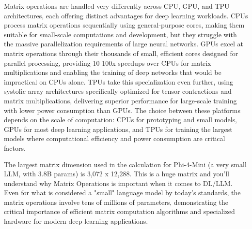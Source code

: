 \begin{remark}
Matrix operations are handled very differently across CPU, GPU, and TPU architectures, each offering distinct advantages for deep learning workloads. CPUs process matrix operations sequentially using general-purpose cores, making them suitable for small-scale computations and development, but they struggle with the massive parallelization requirements of large neural networks. GPUs excel at matrix operations through their thousands of small, efficient cores designed for parallel processing, providing 10-100x speedups over CPUs for matrix multiplications and enabling the training of deep networks that would be impractical on CPUs alone. TPUs take this specialization even further, using systolic array architectures specifically optimized for tensor contractions and matrix multiplications, delivering superior performance for large-scale training with lower power consumption than GPUs. The choice between these platforms depends on the scale of computation: CPUs for prototyping and small models, GPUs for most deep learning applications, and TPUs for training the largest models where computational efficiency and power consumption are critical factors.
\end{remark}

\begin{remark}
The largest matrix dimension used in the calculation for Phi-4-Mini (a very small LLM, with 3.8B params) is 3,072 x 12,288. This is a huge matrix and you'll understand why Matrix Operations is important when it comes to DL/LLM. Even for what is considered a "small" language model by today's standards, the matrix operations involve tens of millions of parameters, demonstrating the critical importance of efficient matrix computation algorithms and specialized hardware for modern deep learning applications.
\end{remark}
